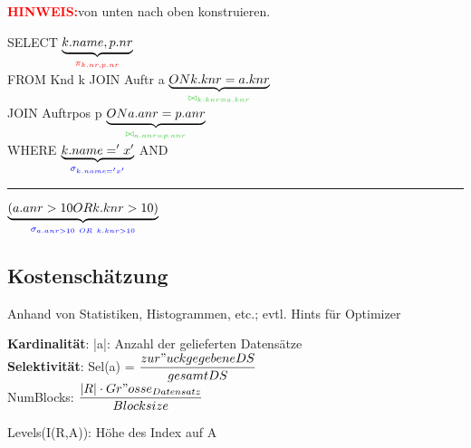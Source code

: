 \newcommand{\proj}{\textcolor{red}{\ensuremath{\pi_{k.nr,p.nr}}}}
\newcommand{\joink}{\textcolor{darkgreen}{\ensuremath{\bowtie_{k.knr = a.knr}}}}
\newcommand{\joina}{\textcolor{darkgreen}{\ensuremath{\bowtie_{a.anr = p.anr}}}}
\newcommand{\selk}{\textcolor{blue}{\ensuremath{\sigma_{k.name = 'x'}} }}
\newcommand{\selor}{\textcolor{blue}{\ensuremath{\sigma_{a.anr > 10~OR~k.knr >10 }}}}
\newcommand{\grpi}[1]{\textcolor{gray}{ \ensuremath{\pi_{ #1 }} }}
\newcommand{\colobr}[3]{\textcolor{#1}{$\underbrace{\textcolor{black}{#2}}_{#3}$}}
\textbf{\textcolor{red}{HINWEIS:}}von unten nach oben konstruieren.\\
\begin{minipage}{0.25\textwidth}
SELECT \colobr{red}{k.name, p.nr}{ \proj } \\
FROM Knd k JOIN Auftr a \colobr{darkgreen}{ ON k.knr = a.knr}{\joink} \\
JOIN Auftrpos p \colobr{darkgreen}{ ON a.anr =p.anr}{\joina} \\
WHERE \colobr{blue}{k.name = 'x'}{\selk} AND\\
\rule{2em}{0em}\colobr{blue}{(a.anr > 10 OR k.knr >10)}{\selor}
\end{minipage}
\begin{minipage}{0.25\textwidth}
\end{minipage}



\subsection{Kostenschätzung}
Anhand von Statistiken, Histogrammen, etc.; evtl. Hints für Optimizer

\textbf{Kardinalität}: |a|: Anzahl der gelieferten Datensätze \\
\textbf{Selektivität}: 
Sel(a) = $\dfrac{zur"uckgegebene DS}{gesamt DS}$\\
NumBlocks: $\dfrac{|R|\cdot Gr"osse_{Datensatz}}{Blocksize}$

Levels(I(R,A)): Höhe des Index auf A


